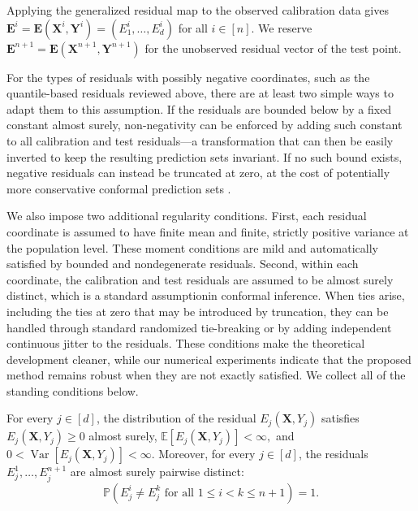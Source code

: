 Applying the generalized residual map to the observed calibration data gives
$\mathbf{E}^i=\mathbf E(\mathbf X^i,\mathbf Y^i)=(E_1^i,\ldots,E_d^i)$ for all
$i\in[n]$. We reserve
$\mathbf{E}^{n+1}=\mathbf E(\mathbf X^{n+1},\mathbf Y^{n+1})$ for the
unobserved residual vector of the test point.

For the types of residuals with possibly negative coordinates, such as the quantile-based residuals reviewed above, there are at least two simple ways to adapt them to this assumption. If the residuals are bounded below by a fixed constant almost surely, non-negativity can be enforced by adding such constant to all calibration and test residuals---a transformation that can then be easily inverted to keep the resulting prediction sets invariant. If no such bound exists, negative residuals can instead be truncated at zero, at the cost of potentially more conservative conformal prediction sets \citep{romano2019conformalized}.

We also impose two additional regularity conditions. First, each residual
coordinate is assumed to have finite mean and finite, strictly positive
variance at the population level. These moment conditions are mild and automatically satisfied by bounded and nondegenerate
residuals. Second, within each
coordinate, the calibration and test residuals are assumed to be almost surely
distinct, which is a standard assumptionin conformal inference.
When ties arise, including the ties at zero that may be introduced by
truncation, they can be handled through standard randomized tie-breaking or
by adding independent continuous jitter to the residuals. These conditions
make the theoretical development cleaner, while our numerical experiments
indicate that the proposed method remains robust when they are not exactly
satisfied. We collect all of the standing conditions below.

\begin{assumption}
\label{eq:assumption-scores}
For every $j\in[d]$, the distribution of the residual $E_j(\mathbf X,Y_j)$ satisfies $E_j(\mathbf X,Y_j)\geq 0 $ almost surely, $
\mathbb E[E_j(\mathbf X,Y_j)]<\infty, $ and $
0<\operatorname{Var}[E_j(\mathbf X,Y_j)]<\infty.$
Moreover, for every $j\in[d]$, the residuals
$E_j^1,\ldots,E_j^{n+1}$ are almost surely pairwise distinct:
\[
\mathbb P\left(
E_j^i\neq E_j^k
\text{ for all }1\leq i<k\leq n+1
\right)=1.
\]

\end{assumption}




